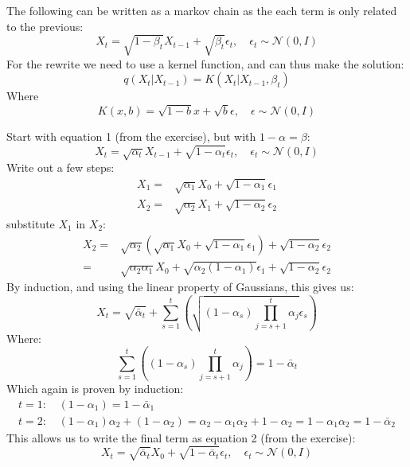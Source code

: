 \documentclass[12pt]{article}    %
\begin{document}

\exminor
The following can be written as a markov chain as the each term is only related to the previous:
\begin{equation} \label{eq:basic-diffusion}
    X_t = \sqrt{1-\beta_t} X_{t-1} + \sqrt{\beta_t} \epsilon_t, \quad \epsilon_t \sim \mathcal{N}(0,I)
\end{equation}
For the rewrite we need to use a kernel function, and can thus make the solution:
\begin{equation} \label{eq:markov-diffusion}
    q(X_t|X_{t-1}) = K(X_t | X_{t-1}, \beta_t)
\end{equation}
Where
\begin{equation}
  K(x, b) = \sqrt{1-b} x + \sqrt{b} \epsilon, \quad \epsilon \sim \mathcal{N}(0,I)
\end{equation}

\exminorhard
Start with equation 1 (from the exercise), but with $1-\alpha = \beta$:
\begin{equation}
    X_t = \sqrt{\alpha_t} X_{t-1} + \sqrt{1-\alpha_t} \epsilon_t, \quad \epsilon_t \sim \mathcal{N}(0,I)
\end{equation}
Write out a few steps:
\begin{align}
    X_1 =& \sqrt{\alpha_1} X_0 + \sqrt{1-\alpha_1} \epsilon_1 \\
    X_2 =& \sqrt{\alpha_2} X_1 + \sqrt{1-\alpha_2} \epsilon_2
\end{align}
substitute $X_1$ in $X_2$:
\begin{align}
    X_2 =& \sqrt{\alpha_2} (\sqrt{\alpha_1} X_0 + \sqrt{1-\alpha_1} \epsilon_1) + \sqrt{1-\alpha_2} \epsilon_2 \\
    =& \sqrt{\alpha_2 \alpha_1} X_0  + \sqrt{\alpha_2(1-\alpha_1)} \epsilon_1 + \sqrt{1-\alpha_2} \epsilon_2
\end{align}
By induction, and using the linear property of Gaussians, this gives us:
\begin{equation}
    X_t = \sqrt{\bar{\alpha}_t} + \sum_{s=1}^{t}\left( \sqrt{(1 - \alpha_s) \prod_{j=s+1}^{t}\alpha_j} \epsilon_s \right)
\end{equation}
Where:
\begin{equation}
    \sum_{s=1}^{t}\left((1 - \alpha_s) \prod_{j=s+1}^{t}\alpha_j \right) = 1 - \bar{\alpha}_t
\end{equation}
Which again is proven by induction:
\begin{align}
    t=1 \text{: }& (1 - \alpha_1) = 1 - \bar{\alpha}_1 \\
    t=2 \text{: }& (1 - \alpha_1) \alpha_2 + (1 - \alpha_2) = \alpha_2 - \alpha_1 \alpha_2  + 1 - \alpha_2 = 1 - \alpha_1 \alpha_2 =  1 - \bar{\alpha}_2
\end{align}
This allows us to write the final term as equation 2 (from the exercise):
\begin{equation} 
    X_t = \sqrt{\bar{\alpha}_t}X_0+\sqrt{1-\bar{\alpha}_t} \epsilon_t, \quad \epsilon_t \sim \mathcal{N}(0,I)
\end{equation}
\end{document}
